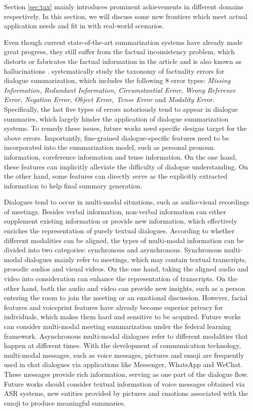\label{sec:new}
Section \ref{sec:tax} mainly introduces prominent achievements in different domains respectively.
In this section, we will discuss some new frontiers which meet actual application needs and fit in with real-world scenarios.

Even though current state-of-the-art summarization systems have already made great progress, they still suffer from the factual inconsistency problem, which distorts or fabricates the factual information in the article and is also known as hallucinations .  systematically study the taxonomy of factuality errors for dialogue summarization,  which includes the following 8 error types: \textit{Missing Information, Redundant Information, Circumstantial Error, Wrong Reference Error, Negation Error, Object Error, Tense Error} and \textit{Modality Error}. 
Specifically, the last five types of errors notoriously tend to appear in dialogue summaries, which largely hinder the application of dialogue summarization systems. 
To remedy these issues, future works need specific designs target for the above errors. Importantly, fine-grained dialogue-specific features need to be incorporated into the summarization model, such as personal pronoun information, coreference information and tense information. On the one hand, these features can implicitly alleviate the difficulty of dialogue understanding. On the other hand, some features can directly serve as the explicitly extracted information to help final summary generation.

Dialogues tend to occur in multi-modal situations, such as audio-visual recordings of meetings.
Besides verbal information, non-verbal information can either supplement existing information or provide new information, which effectively enriches the representation of purely textual dialogues. 
According to whether different modalities can be aligned, the types of multi-modal information can be divided into two categories: synchronous and asynchronous.
Synchronous multi-modal dialogues mainly refer to meetings, which may contain textual transcripts, prosodic audios and visual videos. 
On the one hand, taking the aligned audio and video into consideration can enhance the representation of transcripts.
On the other hand, both the audio and video can provide new insights, such as a person entering the room to join the meeting or an emotional discussion.
However, facial features and voiceprint features have already become superior privacy for individuals, which makes them hard and sensitive to be acquired. Future works can consider multi-modal meeting summarization under the federal learning framework.
Asynchronous multi-modal dialogues refer to different modalities that happen at different times. 
With the development of communication technology, multi-modal messages, such as voice messages, pictures and emoji are frequently used in chat dialogues via applications like Messenger, WhatsApp and WeChat. 
These messages provide rich information, serving as one part of the dialogue flow.
Future works should consider textual information of voice messages obtained via ASR systems, new entities provided by pictures and emotions associated with the emoji to produce meaningful summaries.

